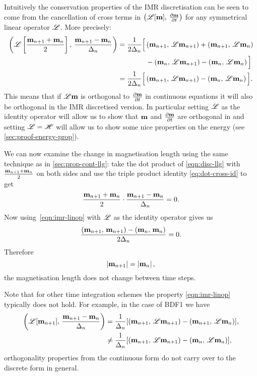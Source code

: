 Intuitively the conservation properties of the IMR discretisation can be seen to come from the cancellation of cross terms in $\left(\mathscr{L}[\mathbf{m}],\, \frac{\partial \mathbf{m}}{\partial t} \right)$ for any symmetrical linear operator $\mathscr{L}$.
More precisely:
\begin{equation}
  \begin{aligned}
    \label{eqn:imr-linop}
    \left(\mathscr{L} \left[ \frac{\mathbf{m}_{n+1} + \mathbf{m}_n}{2} \right],\,  \frac{\mathbf{m}_{n+1} - \mathbf{m}_n}{\Delta_{n}}  \right)
    &= \frac{1}{2\Delta_{n}} \Big[
    \left(\mathbf{m}_{n+1},\, \mathscr{L} \mathbf{m}_{n+1} \right) + \left(\mathbf{m}_{n+1},\, \mathscr{L} \mathbf{m}_{n} \right) \\
    & \qquad\qquad - \left(\mathbf{m}_{n},\, \mathscr{L} \mathbf{m}_{n+1} \right) - \left(\mathbf{m}_{n},\, \mathscr{L} \mathbf{m}_{n} \right)
    \Big] \\
    &= \frac{1}{2\Delta_{n}} \Big[
    \left(\mathbf{m}_{n+1},\, \mathscr{L} \mathbf{m}_{n+1} \right)
    - \left(\mathbf{m}_{n},\, \mathscr{L} \mathbf{m}_{n} \right)
    \Big].
  \end{aligned}
\end{equation}
This means that if $\mathscr{L} \mathbf{m}$ is orthogonal to $\frac{\partial \mathbf{m}}{\partial t}$ in continuous equations it will also be orthogonal in the IMR discretised version.
In particular setting $\mathscr{L}$ as the identity operator will allow us to show that $\mathbf{m}$ and $\frac{\partial \mathbf{m}}{\partial t}$ are orthogonal in  and setting $\mathscr{L} = \mathscr{H}$ will allow us to show some nice properties on the energy (see \cref{sec:proof-energy-prop}).

We can now examine the change in magnetisation length using the same technique as in \cref{sec:prop-cont-llg}: take the dot product of \cref{eqn:disc-llg} with $\frac{\mathbf{m}_{n+1} + \mathbf{m}_n}{2}$ on both sides and use the triple product identity \cref{eq:dot-cross-id} to get
\begin{equation}
  \label{eq:63}
  \frac{\mathbf{m}_{n+1} + \mathbf{m}_n}{2} \cdot \frac{\mathbf{m}_{n+1} - \mathbf{m}_n}{\Delta_{n}} = 0.
\end{equation}
Now using~\cref{eqn:imr-linop} with $\mathscr{L}$ as the identity operator gives us
\begin{equation}
  \frac{\left(\mathbf{m}_{n+1},\, \mathbf{m}_{n+1} \right) - \left(\mathbf{m}_n,\, \mathbf{m}_n \right) }{2 \Delta_{n}} = 0.
\end{equation}
Therefore
\begin{equation}
  \left|{\mathbf{m}_{n+1}} \right| = \left|{\mathbf{m}_n} \right|,
\end{equation}
\ie the magnetisation length does not change between time steps.

Note that for other time integration schemes the property \cref{eqn:imr-linop} typically does not hold.
For example, in the case of BDF1 we have
\begin{equation}
  \begin{aligned}
    \left(\mathscr{L} {\left[ \mathbf{m}_{n+1} \right]},\,  \frac{\mathbf{m}_{n+1} - \mathbf{m}_n}{\Delta_{n}}  \right)
    &= \frac{1}{\Delta_{n}} {\left[  \left(\mathbf{m}_{n+1},\, \mathscr{L} \mathbf{m}_{n+1} \right) 
      - \left(\mathbf{m}_{n+1},\, \mathscr{L} \mathbf{m}_n \right)  \right]}, \\
    &\neq \frac{1}{\Delta_{n}} {\left[  \left(\mathbf{m}_{n+1},\, \mathscr{L} \mathbf{m}_{n+1} \right)
      - \left(\mathbf{m}_n,\, \mathscr{L} \mathbf{m}_n \right)  \right]},
  \end{aligned}
\end{equation}
\ie orthogonality properties from the continuous form do not carry over to the discrete form in general.

